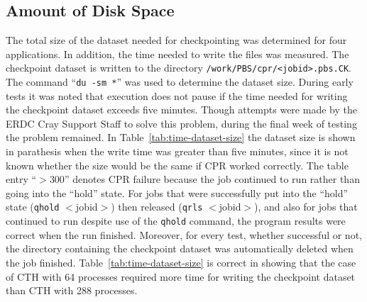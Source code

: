 \documentclass[12pt]{article}
\begin{document}

\subsection*{Amount of Disk Space}
\label{subsec:amount-of-disk-space}

The total size of the dataset needed for checkpointing
was determined for four applications.
In addition, the time needed to write the files was measured.
The checkpoint dataset is written to the directory
{\tt /work/PBS/cpr/<jobid>.pbs.CK}.
The command ``{\tt du -sm *}'' was used to determine the dataset size.
During early tests it was noted that execution does not pause
if the time needed for writing the checkpoint dataset exceeds
five minutes.
Though attempts were made by the ERDC Cray Support Staff to solve
this problem, during the final week of testing the problem remained.
In Table~\ref{tab:time-dataset-size} the dataset size is shown
in parathesis when the write time was greater than five minutes,
since it is not known whether the size would be the same if
CPR worked correctly.
The table entry ``$ > 300 $'' denotes CPR failure
because the job continued to run
rather than going into the ``hold'' state.
For jobs that were successfully put into the ``hold'' state
({\tt qhold} $<$jobid$>$) then released ({\tt qrls} $<$jobid$>$),
and also for jobs that continued to run
despite use of the {\tt qhold} command,
the program results were correct when the run finished.
Moreover, for every test, whether successful or not,
the directory containing the checkpoint dataset
was automatically deleted when the job finished.
Table~\ref{tab:time-dataset-size} is correct
in showing that the case of CTH with 64 processes
required more time for writing the checkpoint dataset than
CTH with 288 processes.
\end{document}
